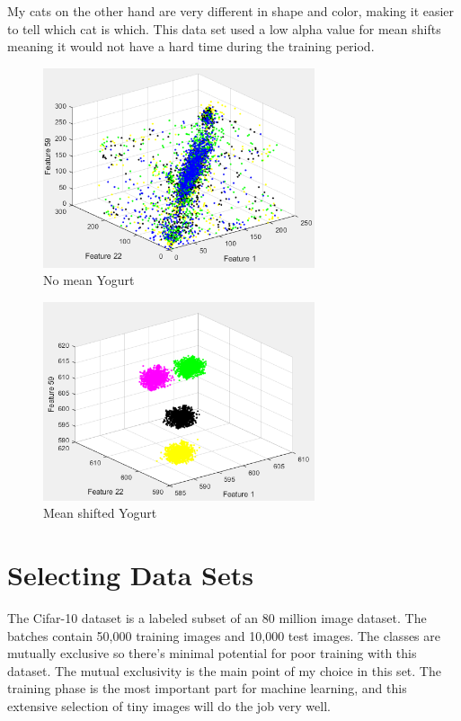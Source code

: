 \documentclass[12pt, letterpaper]{article}
\begin{document}
My cats on the other hand are very different in shape and color, making it easier to tell which cat is which. This data set used a low alpha value for mean shifts meaning it would not have a hard time during the training period.

\begin{figure}[H]
\centering
\includegraphics[width=8cm]{nomeanYogurt}
\caption{{No mean Yogurt}}
\label{fig:nmy}
\end{figure}


\begin{figure}[H]
\centering
\includegraphics[width=8cm]{meanshiftedYogurt}
\caption{{Mean shifted Yogurt}}
\label{fig:msy}
\end{figure}


\section{Selecting Data Sets} 

The Cifar-10 dataset is a labeled subset of an 80 million image dataset. The batches contain 50,000 training images and 10,000 test images. The classes are mutually exclusive so there’s minimal potential for poor training with this dataset. The mutual exclusivity is the main point of my choice in this set. The training phase is the most important part for machine learning, and this extensive selection of tiny images will do the job very well. \\
\end{document}
